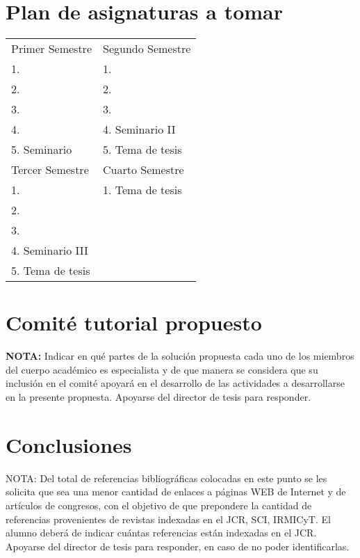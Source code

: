 \documentclass[runningheads,a4paper]{book}
\begin{document}
\section{Plan de asignaturas a tomar}
\begin{table}
\begin{center}
 \begin{tabular}{|l|l|}
\hline\noalign{\smallskip}
Primer Semestre & Segundo Semestre\\
1. & 1.\\
2. & 2.\\
3. & 3.\\
4. & 4. Seminario II\\
5. Seminario & 5. Tema de tesis\\
\hline\noalign{\smallskip}
Tercer Semestre & Cuarto Semestre\\
1. & 1. Tema de tesis\\
2. & \\
3. & \\
4. Seminario III& \\
5. Tema de tesis & \\
\hline
\end{tabular}
\end{center}
\end{table}

\section{Comit\'e tutorial propuesto}

\textbf{NOTA:} Indicar en qué partes de la solución propuesta cada uno de los miembros del cuerpo académico es especialista y de que manera se considera que su inclusión en el comité apoyará en el desarrollo de las actividades a desarrollarse en la presente propuesta. Apoyarse del director de tesis para responder.

\section{Conclusiones}

NOTA: Del total de referencias bibliográficas colocadas en este punto se les solicita que sea una menor cantidad de enlaces a páginas WEB de Internet y de artículos de congresos, con el objetivo de que prepondere la cantidad de referencias provenientes de revistas indexadas en el JCR, SCI, IRMICyT. El alumno deberá de indicar cuántas referencias están indexadas en el JCR. Apoyarse del director de tesis para responder, en caso de no poder identificarlas.
\end{document}
